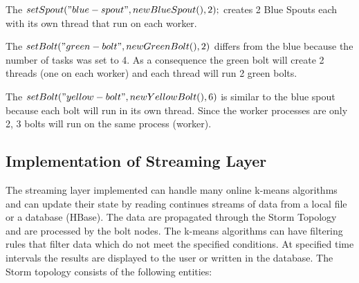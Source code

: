 \documentclass{lmproj}
\begin{document}
The $setSpout("blue-spout", new BlueSpout(), 2);$ \space [3] creates 2 Blue Spouts each with its own thread that run on each worker.

The $setBolt("green-bolt", new GreenBolt(), 2)$ \space [4] differs from the blue because the number of tasks was set to 4. As a consequence the green bolt will create 2 threads (one on each worker) and each thread will run 2 green bolts.

The $setBolt("yellow-bolt", new YellowBolt(), 6)$ \space [5] is similar to the blue spout because each bolt will run in its own thread. Since the worker processes are only 2, 3 bolts will run on the same process (worker). 

\subsection{Implementation of Streaming Layer}

The streaming layer implemented can handle many online k-means algorithms and can update their state by reading continues streams of data from a local file or a database (HBase). The data are propagated through the Storm Topology and are processed by the bolt nodes. The k-means algorithms can have filtering rules that filter data which do not meet the specified conditions. At specified time intervals the results are displayed to the user or written in the database. The Storm topology consists of the following entities:
\end{document}
